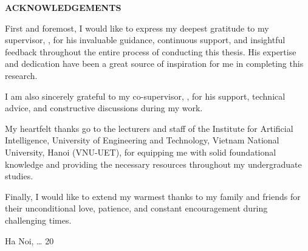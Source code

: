 \thispagestyle{plain}
\begin{center}
{\fontsize{13}{16}\selectfont\bfseries ACKNOWLEDGEMENTS}
\end{center}
\vspace{1em}

First and foremost, I would like to express my deepest gratitude to my supervisor,
\supervisorName, for his invaluable guidance, continuous support, and insightful feedback
throughout the entire process of conducting this thesis. His expertise and dedication have
been a great source of inspiration for me in completing this research.

I am also sincerely grateful to my co-supervisor, \coSupervisorName, for his support,
technical advice, and constructive discussions during my work.

My heartfelt thanks go to the lecturers and staff of the Institute for Artificial
Intelligence, University of Engineering and Technology, Vietnam National University, Hanoi
(VNU-UET), for equipping me with solid foundational knowledge and providing the necessary
resources throughout my undergraduate studies.

Finally, I would like to extend my warmest thanks to my family and friends for their
unconditional love, patience, and constant encouragement during challenging times.

\vspace{2em}
\begin{flushright}
Ha Noi, \ldots{} 20\\[0.5em]
\authorNameEn
\end{flushright}
\clearpage
